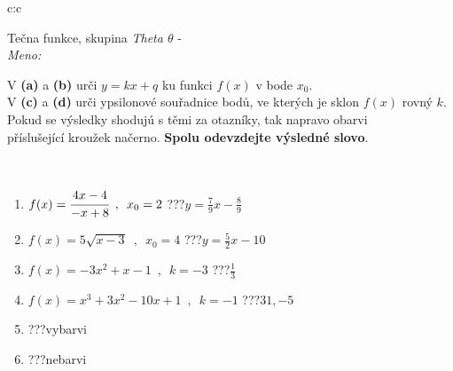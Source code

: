 \documentclass[10pt]{report}
\begin{document}
\newpage
\thispagestyle{empty}
\begin{tabular}{c:c}
\begin{minipage}[c][104.5mm][t]{0.5\linewidth}
\begin{center}
\vspace{7mm}
{\huge Tečna funkce, skupina \textit{Theta $\theta$} -}\\[5mm]
\textit{Meno:}\phantom{xxxxxxxxxxxxxxxxxxxxxxxxxxxxxxxxxxxxxxxxxxxxxxxxxxxxxxxxxxxxxxxxx}\\[5mm]
\begin{minipage}{0.95\linewidth}
\begin{center}
V \textbf{(a)} a \textbf{(b)} urči  $y = kx + q$ ku funkci $f(x)$ v bode $x_0$.\\V \textbf{(c)} a \textbf{(d)} urči ypsilonové souřadnice bodů, ve kterých je sklon $f(x)$ rovný $k$.\\Pokud se výsledky shodujú s těmi za otazníky, tak napravo obarvi\\příslušející kroužek načerno. \textbf{Spolu odevzdejte výsledné slovo}.
\end{center}
\end{minipage}
\\[1mm]
\begin{minipage}{0.79\linewidth}
\begin{center}
\begin{varwidth}{\linewidth}
\begin{enumerate}
\small
\item $f(x)=\cfrac{4x-4}{-x+8}\enspace , \enspace x_0=2$\quad \dotfill\; ???\;\dotfill \quad $y = \frac{7}{9}x-\frac{8}{9}$
\item $f(x)=5\sqrt{x-3}\enspace , \enspace x_0=4$\quad \dotfill\; ???\;\dotfill \quad $y = \frac{5}{2}x-10$
\item $f(x)=-3x^2+x-1\enspace , \enspace k=-3$\quad \dotfill\; ???\;\dotfill \quad $\frac{1}{3}$
\item $f(x)=x^3+3x^2-10x+1\enspace , \enspace k=-1$\quad \dotfill\; ???\;\dotfill \quad $31 , -5$
\item \quad \dotfill\; ???\;\dotfill \quad vybarvi
\item \quad \dotfill\; ???\;\dotfill \quad nebarvi
\end{enumerate}
\end{varwidth}
\end{center}
\end{minipage}
\begin{minipage}{0.20\linewidth}

\end{minipage}
\end{center}
\end{minipage}
\end{tabular}
\end{document}
